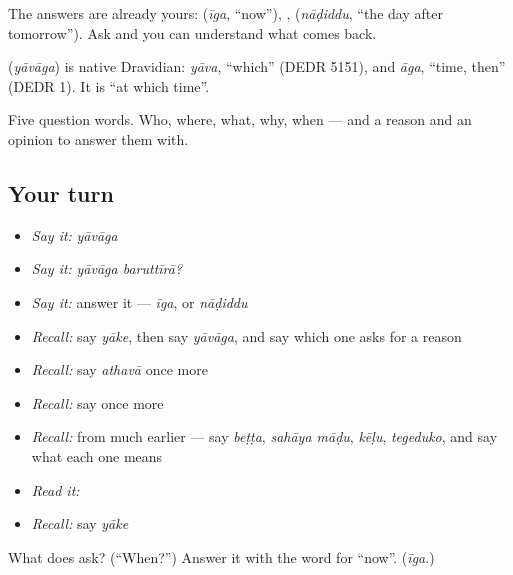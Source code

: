 The answers are already yours:  (\emph{īga}, \textquotedblleft{}now\textquotedblright{}), ,  (\emph{nāḍiddu}, \textquotedblleft{}the day after tomorrow\textquotedblright{}). Ask  and you can understand what comes back.

\begin{cousinweb}
\textbf{} (\emph{yāvāga}) is native Dravidian: \emph{yāva}, \textquotedblleft{}which\textquotedblright{} (DEDR 5151), and \emph{āga}, \textquotedblleft{}time, then\textquotedblright{} (DEDR 1). It is \textquotedblleft{}at which time\textquotedblright{}.
\end{cousinweb}

\begin{grammarlens}[title={What you've built}]
Five question words. Who, where, what, why, when — and a reason and an opinion to answer them with.
\end{grammarlens}

\subsection*{Your turn}
\begin{itemize}
\raggedright
  \item \emph{Say it:} \emph{yāvāga}
  \item \emph{Say it:} \emph{yāvāga baruttīrā?}
  \item \emph{Say it:} answer it — \emph{īga}, or \emph{nāḍiddu}
  \item \emph{Recall:} say \emph{yāke}, then say \emph{yāvāga}, and say which one asks for a reason
  \item \emph{Recall:} say \emph{athavā} once more
  \item \emph{Recall:} say \emph{} once more
  \item \emph{Recall:} from much earlier — say \emph{beṭṭa}, \emph{sahāya māḍu}, \emph{kēḷu}, \emph{tegeduko}, and say what each one means
  \item \emph{Read it:} \textbf{}
  \item \emph{Recall:} say \emph{yāke}
\end{itemize}

\begin{tcolorbox}[breakable,colback=teal!4,colframe=teal!35!black,title={Before you move on}]
What does  ask? (\textquotedblleft{}When?\textquotedblright{}) Answer it with the word for \textquotedblleft{}now\textquotedblright{}. (\emph{īga}.)
\end{tcolorbox}
